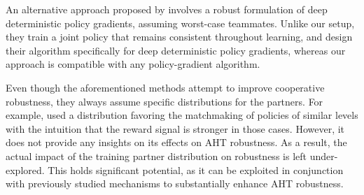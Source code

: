 

An alternative approach proposed by \citet{li_robust_multi_agent_2019} involves a robust formulation of deep deterministic policy gradients, assuming worst-case teammates. Unlike our setup, they train a joint policy that remains consistent throughout learning, and design their algorithm specifically for deep deterministic policy gradients, whereas our approach is compatible with any policy-gradient algorithm.



Even though the aforementioned methods attempt to improve cooperative robustness, they always assume specific distributions for the partners. For example, \citet{jaderberg_human_level_performance_2019} used a distribution favoring the matchmaking of policies of similar levels with the intuition that the reward signal is stronger in those cases. However, it does not provide any insights on its effects on AHT robustness. As a result, the actual impact of the training partner distribution on robustness is left under-explored. This holds significant potential, as it can be exploited in conjunction with previously studied mechanisms to substantially enhance AHT robustness.





